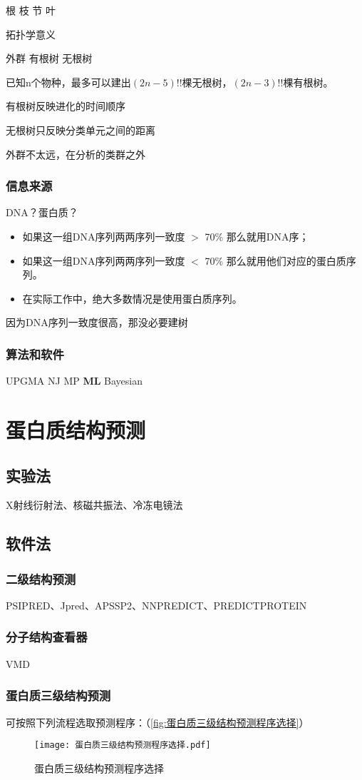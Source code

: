 根 枝 节 叶

拓扑学意义

外群 有根树 无根树

已知n个物种，最多可以建出$(2n-5)!!$棵无根树，$(2n-3)!!$棵有根树。



有根树反映进化的时间顺序

无根树只反映分类单元之间的距离

外群不太远，在分析的类群之外

\subsubsection{信息来源}

DNA？蛋白质？

\begin{itemize}
	\item 如果这一组DNA序列两两序列一致度 $>$ 70\% 那么就用DNA序；
	\item 如果这一组DNA序列两两序列一致度 $<$ 70\% 那么就用他们对应的蛋白质序列。
	\item 在实际工作中，绝大多数情况是使用蛋白质序列。
\end{itemize}

因为DNA序列一致度很高，那没必要建树

\subsubsection{算法和软件}

UPGMA NJ MP \textbf{ML} Bayesian


\section{蛋白质结构预测}

\subsection{实验法}

X射线衍射法、核磁共振法、冷冻电镜法

\subsection{软件法}

\subsubsection{二级结构预测}

PSIPRED、Jpred、APSSP2、NNPREDICT、PREDICTPROTEIN

\subsubsection{分子结构查看器}

VMD



\subsubsection{蛋白质三级结构预测}

可按照下列流程选取预测程序：（\autoref{fig:蛋白质三级结构预测程序选择}）

\begin{figure}[htbp]
	\centering
	\texttt{[image: 蛋白质三级结构预测程序选择.pdf]}
	\caption{蛋白质三级结构预测程序选择}
	\label{fig:蛋白质三级结构预测程序选择}
\end{figure}
